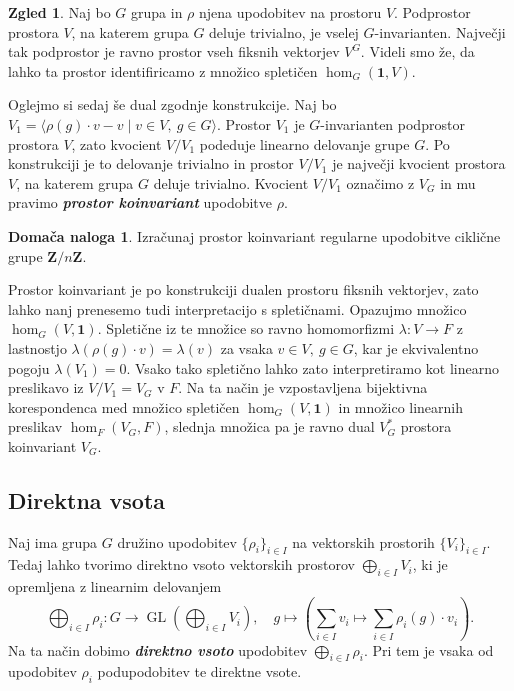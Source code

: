 \documentclass[11pt]{book}
\def\ZZ{\mathbf{Z}}
\def\11{\mathbf{1}}
\DeclareMathOperator\GL{GL}
\def\definicija{\color{rdeca}\bf\em}
\theoremstyle{definition}
\theoremstyle{zgled}
\newtheorem*{zgled}{Zgled}
\theoremstyle{odprtproblem}
\theoremstyle{domacanaloga}
\newtheorem*{domacanaloga}{Domača naloga}
\theoremstyle{izrek}
\begin{document}
\begin{zgled}
Naj bo $G$ grupa in $\rho$ njena upodobitev na prostoru $V$. Podprostor prostora $V$, na katerem grupa $G$ deluje trivialno, je vselej $G$-invarianten. Največji tak podprostor je ravno prostor vseh fiksnih vektorjev $V^G$. Videli smo že, da lahko ta prostor identifiricamo z množico spletičen $\hom_G(\11, V)$.
    
Oglejmo si sedaj še dual zgodnje konstrukcije. Naj bo $V_1 = \langle \rho(g) \cdot v - v \mid v \in V, \ g \in G \rangle$. Prostor $V_1$ je $G$-invarianten podprostor prostora $V$, zato kvocient $V/V_1$ podeduje linearno delovanje grupe $G$. Po konstrukciji je to delovanje trivialno in prostor $V/V_1$ je največji kvocient prostora $V$, na katerem grupa $G$ deluje trivialno. Kvocient $V/V_1$ označimo z $V_G$ in mu pravimo {\definicija prostor koinvariant} upodobitve $\rho$.

\begin{domacanaloga}
    Izračunaj prostor koinvariant regularne upodobitve ciklične grupe $\ZZ/n\ZZ$.
\end{domacanaloga}

Prostor koinvariant je po konstrukciji dualen prostoru fiksnih vektorjev, zato lahko nanj prenesemo tudi interpretacijo s spletičnami. Opazujmo množico $\hom_G(V, \11)$. Spletične iz te množice so ravno homomorfizmi $\lambda \colon V \to F$ z lastnostjo $\lambda(\rho(g) \cdot v) = \lambda(v)$ za vsaka $v \in V, \ g \in G$, kar je ekvivalentno pogoju $\lambda(V_1) = 0$. Vsako tako spletično lahko zato interpretiramo kot linearno preslikavo iz $V/V_1 = V_G$ v $F$. Na ta način je vzpostavljena bijektivna korespondenca med množico spletičen $\hom_G(V,\11)$ in množico linearnih preslikav $\hom_F(V_G, F)$, slednja množica pa je ravno dual $V_G^*$ prostora koinvariant $V_G$.
\end{zgled}

\subsection{Direktna vsota}

Naj ima grupa $G$ družino upodobitev $\{ \rho_i \}_{i \in I}$ na vektorskih prostorih $\{ V_i \}_{i \in I}$. Tedaj lahko tvorimo direktno vsoto vektorskih prostorov $\bigoplus_{i \in I} V_i$, ki je opremljena z linearnim delovanjem
\[
  \bigoplus_{i \in I} \rho_i \colon G \to \GL(\bigoplus_{i \in I} V_i), \quad
  g \mapsto \left( \sum_{i \in I} v_i \mapsto \sum_{i \in I} \rho_i(g) \cdot v_i \right).
\]
Na ta način dobimo {\definicija direktno vsoto} upodobitev $\bigoplus_{i \in I} \rho_i$. Pri tem je vsaka od upodobitev $\rho_i$ podupodobitev te direktne vsote.
\end{document}
